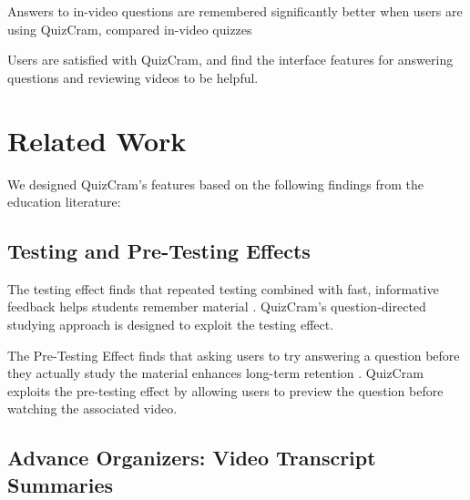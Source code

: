 \documentclass{chi-ext}
\begin{document}

\begin{compactitem}
\item Answers to in-video questions are remembered significantly better when users are using QuizCram, compared in-video quizzes
\item Users are satisfied with QuizCram, and find the interface features for answering questions and reviewing videos to be helpful.
\end{compactitem}

\section{Related Work}
We designed QuizCram's features based on the following findings from the education literature:%

\subsection{Testing and Pre-Testing Effects}

The testing effect finds that repeated testing combined with fast, informative feedback helps students remember material \cite{testingeffect}. QuizCram's question-directed studying approach is designed to exploit the testing effect. %

The Pre-Testing Effect finds that asking users to try answering a question before they actually study the material enhances long-term retention \cite{pretesting}. QuizCram exploits the pre-testing effect by allowing users to preview the question before watching the associated video.

\subsection{Advance Organizers: Video Transcript Summaries}
\end{document}
